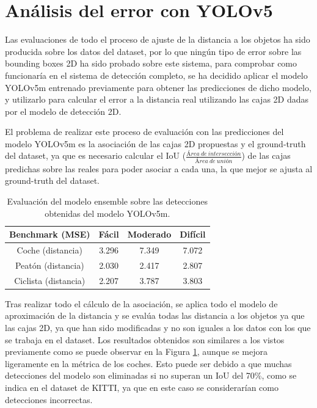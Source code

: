 \section{Análisis del error con YOLOv5}
\label{sec:Análisis del error con YOLOv5}

Las evaluaciones de todo el proceso de ajuste de la distancia a los objetos ha sido producida sobre los datos del dataset, por lo que ningún tipo de error sobre las bounding boxes 2D ha sido probado sobre este sistema, para comprobar como funcionaría en el sistema de detección completo, se ha decidido aplicar el modelo YOLOv5m entrenado previamente para obtener las predicciones de dicho modelo, y utilizarlo para calcular el error a la distancia real utilizando las cajas 2D dadas por el modelo de detección 2D.

El problema de realizar este proceso de evaluación con las predicciones del modelo YOLOv5m es la asociación de las cajas 2D propuestas y el ground-truth del dataset, ya que es necesario calcular el \ac{IoU} ($\frac{Área\ de\ intersección}{Área\ de\ unión}$) de las cajas predichas sobre las reales para poder asociar a cada una, la que mejor se ajusta al ground-truth del dataset.

\begin{table}[H]
\centering
\begin{tabular}{|c|c|c|c|}
\hline
\textbf{Benchmark (MSE)} & \textbf{Fácil} & \textbf{Moderado} & \textbf{Difícil}\\ \hline \hline
Coche (distancia)        & 3.296          & 7.349             & 7.072\\ \hline
Peatón (distancia)       & 2.030          & 2.417             & 2.807\\ \hline
Ciclista (distancia)     & 2.207          & 3.787             & 3.803\\ \hline
\end{tabular}
\caption{Evaluación del modelo ensemble sobre las detecciones obtenidas del modelo YOLOv5m.}
\label{fig:Evaluación del modelo ensemble sobre las detecciones obtenidas del modelo YOLOv5m.}
\end{table}

Tras realizar todo el cálculo de la asociación, se aplica todo el modelo de aproximación de la distancia y se evalúa todas las distancia a los objetos ya que las cajas 2D, ya que han sido modificadas y no son iguales a los datos con los que se trabaja en el dataset. Los resultados obtenidos son similares a los vistos previamente como se puede observar en la Figura \ref{fig:Evaluación del modelo ensemble sobre las detecciones obtenidas del modelo YOLOv5m.}, aunque se mejora ligeramente en la métrica de los coches. Esto puede ser debido a que muchas detecciones del modelo son eliminadas si no superan un \ac{IoU} del 70\%, como se indica en el dataset de KITTI, ya que en este caso se considerarían como detecciones incorrectas.